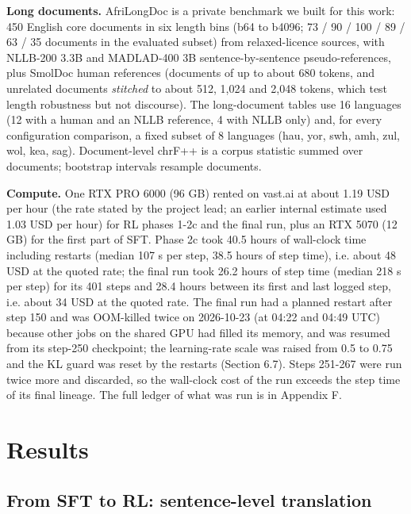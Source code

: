 \textbf{Long documents.} AfriLongDoc is a private benchmark we built for this work: 450 English core documents in six length bins (b64 to b4096; 73 / 90 / 100 / 89 / 63 / 35 documents in the evaluated subset) from relaxed-licence sources, with NLLB-200 3.3B and MADLAD-400 3B sentence-by-sentence pseudo-references, plus SmolDoc human references (documents of up to about 680 tokens, and unrelated documents \emph{stitched} to about 512, 1,024 and 2,048 tokens, which test length robustness but not discourse). The long-document tables use 16 languages (12 with a human and an NLLB reference, 4 with NLLB only) and, for every configuration comparison, a fixed subset of 8 languages (hau, yor, swh, amh, zul, wol, kea, sag). Document-level chrF++ is a corpus statistic summed over documents; bootstrap intervals resample documents.

\textbf{Compute.} One RTX PRO 6000 (96 GB) rented on vast.ai at about 1.19 USD per hour (the rate stated by the project lead; an earlier internal estimate used 1.03 USD per hour) for RL phases 1-2c and the final run, plus an RTX 5070 (12 GB) for the first part of SFT. Phase 2c took 40.5 hours of wall-clock time including restarts (median 107 s per step, 38.5 hours of step time), i.e. about 48 USD at the quoted rate; the final run took 26.2 hours of step time (median 218 s per step) for its 401 steps and 28.4 hours between its first and last logged step, i.e. about 34 USD at the quoted rate. The final run had a planned restart after step 150 and was OOM-killed twice on 2026-10-23 (at 04:22 and 04:49 UTC) because other jobs on the shared GPU had filled its memory, and was resumed from its step-250 checkpoint; the learning-rate scale was raised from 0.5 to 0.75 and the KL guard was reset by the restarts (Section 6.7). Steps 251-267 were run twice more and discarded, so the wall-clock cost of the run exceeds the step time of its final lineage. The full ledger of what was run is in Appendix F.

\section{Results}\label{results}

\subsection{From SFT to RL: sentence-level translation}\label{from-sft-to-rl-sentence-level-translation}

